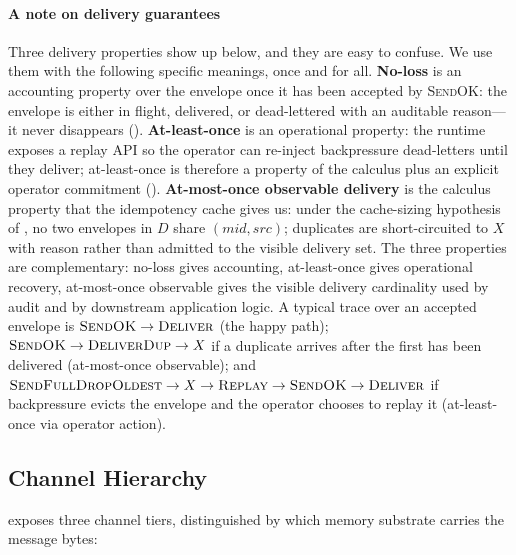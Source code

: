 \paragraph{A note on delivery guarantees}
Three delivery properties show up below, and they are easy to
confuse.  We use them with the following specific meanings, once
and for all.  \textbf{No-loss} is an accounting property over the
envelope once it has been accepted by \textsc{SendOK}: the envelope
is either in flight, delivered, or dead-lettered with an auditable
reason—it never disappears ().
\textbf{At-least-once} is an operational property: the runtime
exposes a replay API so the operator can re-inject backpressure
dead-letters until they deliver; at-least-once is therefore a
property of the calculus plus an explicit operator commitment
().  \textbf{At-most-once observable delivery} is
the calculus property that the idempotency cache gives us: under
the cache-sizing hypothesis of
, no two envelopes in \(D\) share
\((\mathit{mid}, \mathit{src})\); duplicates are short-circuited to
\(X\) with reason  rather than admitted
to the visible delivery set.  The three properties are
complementary: no-loss gives accounting, at-least-once gives
operational recovery, at-most-once observable gives the visible
delivery cardinality used by audit and by downstream application
logic.  A typical trace over an accepted envelope is
\(\textsc{SendOK} \to \textsc{Deliver}\) (the happy path);
\(\textsc{SendOK} \to \textsc{DeliverDup} \to X\) if a duplicate
arrives after the first has been delivered (at-most-once
observable); and \(\textsc{SendFullDropOldest} \to X
\to \textsc{Replay} \to \textsc{SendOK} \to \textsc{Deliver}\) if
backpressure evicts the envelope and the operator chooses to
replay it (at-least-once via operator action).

\subsection{Channel Hierarchy}
\label{sec:k2k:tiers}

\system{} exposes three channel tiers, distinguished by which memory
substrate carries the message bytes:

